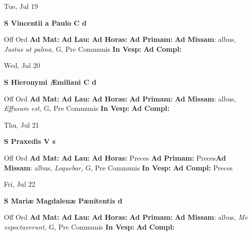 \documentclass[10pt]{memoir}
\begin{document}
\begin{center}
\begin{minipage}{3.5in}
\vspace{2em}
\begin{center}Tue, Jul 19
\end{center}
\textbf{ \large S Vincentii a Paulo C
\textnormal{\normalsize d}}

\begin{justify}Off Ord
\textbf{Ad Mat: }
\textbf{Ad Lau: }
\textbf{Ad Horas: }
\textbf{Ad Primam: }\textbf{Ad Missam}: albus, \textit{Justus ut palma,} G, Pre Communis
\textbf{In Vesp: }
\textbf{Ad Compl: }
\end{justify}
\end{minipage}
\end{center}

\begin{center}
\begin{minipage}{3.5in}
\vspace{2em}
\begin{center}Wed, Jul 20
\end{center}
\textbf{ \large S Hieronymi Æmiliani C
\textnormal{\normalsize d}}

\begin{justify}Off Ord
\textbf{Ad Mat: }
\textbf{Ad Lau: }
\textbf{Ad Horas: }
\textbf{Ad Primam: }\textbf{Ad Missam}: albus, \textit{Effusum est,} G, Pre Communis
\textbf{In Vesp: }
\textbf{Ad Compl: }
\end{justify}
\end{minipage}
\end{center}

\begin{center}
\begin{minipage}{3.5in}
\vspace{2em}
\begin{center}Thu, Jul 21
\end{center}
\textbf{ \large S Praxedis V
\textnormal{\normalsize s}}

\begin{justify}Off Ord
\textbf{Ad Mat: }
\textbf{Ad Lau: }
\textbf{Ad Horas: }Preces
\textbf{Ad Primam: }Preces\textbf{Ad Missam}: albus, \textit{Loquebar,} G, Pre Communis
\textbf{In Vesp: }
\textbf{Ad Compl: }Preces
\end{justify}
\end{minipage}
\end{center}

\begin{center}
\begin{minipage}{3.5in}
\vspace{2em}
\begin{center}Fri, Jul 22
\end{center}
\textbf{ \large S Mariæ Magdalenæ Pænitentis
\textnormal{\normalsize d}}

\begin{justify}Off Ord
\textbf{Ad Mat: }
\textbf{Ad Lau: }
\textbf{Ad Horas: }
\textbf{Ad Primam: }\textbf{Ad Missam}: albus, \textit{Me expectaverunt,} G, Pre Communis
\textbf{In Vesp: }
\textbf{Ad Compl: }
\end{justify}
\end{minipage}
\end{center}
\end{document}
